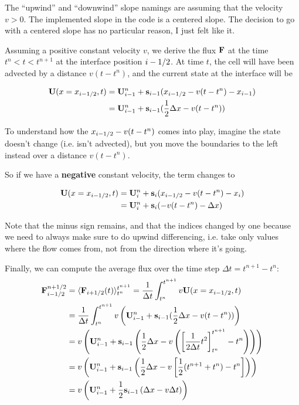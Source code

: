 The ``upwind'' and ``downwind'' slope namings are assuming that the velocity $v > 0$.
The implemented slope in the code is a centered slope.
The decision to go with a centered slope has no particular reason, I just felt like it.



Assuming a positive constant velocity $v$, we derive the flux $\mathbf{F}$ at the time $t^n < t < t^{n+1}$ at the interface position $i-1/2$.
At time $t$, the cell will have been advected by a distance $v (t - t^n)$, and the current state at the interface will be

\begin{align*}
	\mathbf{U}(x=x_{i-1/2}, t) 
		&= \mathbf{U}_{i-1}^n + \mathbf{s}_{i-1} (x_{i-1/2} - v (t - t^n) - x_{i-1}) \\
		&= \mathbf{U}_{i-1}^n + \mathbf{s}_{i-1} (\frac{1}{2} \Delta x - v (t - t^n))
\end{align*}

To understand how the $x_{i-1/2} - v (t - t^n)$ comes into play, imagine the state doesn't change (i.e. isn't advected), but you move the boundaries to the left instead over a distance $v(t - t^n)$.

So if we have a \textbf{negative} constant velocity, the term changes to 

\begin{align*}
	\mathbf{U}(x=x_{i-1/2}, t) 
		&= \mathbf{U}_{i}^n + \mathbf{s}_{i} (x_{i-1/2} - v (t - t^n) - x_{i}) \\
		&= \mathbf{U}_{i}^n + \mathbf{s}_{i} (-v (t - t^n) - \Delta x)
\end{align*}



Note that the minus sign remains, and that the indices changed by one because we need to always make sure to do upwind differencing, i.e. take only values where the flow comes from, not from the direction where it's going.

Finally, we can compute the average flux over the time step $\Delta t = t^{n+1} - t^{n}$:
\begin{align}
	\mathbf{F}_{i-1/2}^{n+1/2} 
	&= \langle \mathbf{F}_{i+1/2}(t)\rangle _{t^n} ^ {t^{n+1}} 
	= \frac{1}{\Delta t} \int_{t^n}^{t^{n+1}} v \mathbf{U}(x 
	= x_{i-1/2}, t) \\
	&= \frac{1}{\Delta t} \int_{t^n}^{t^{n+1}} v \left( \mathbf{U}_{i-1}^n + \mathbf{s}_{i-1} (\frac{1}{2} \Delta x - v (t - t^n)) \right) \\
	&= v \left( \mathbf{U}_{i-1}^n  + \mathbf{s}_{i-1} \left( \frac{1}{2} \Delta x - v \left( \left[ \frac{1}{2 \Delta t} t^2 \right]_{t^n}^{t^{n+1}} - t^n \right)  \right) \right) \\
	&= v \left( \mathbf{U}_{i-1}^n  + \mathbf{s}_{i-1} \left( \frac{1}{2} \Delta x - v \left[ \frac{1}{2} (t^{n+1} + t^n) - t^n \right] \right) \right) \\
	&= v \left( \mathbf{U}_{i-1}^n  + \frac{1}{2} \mathbf{s}_{i-1} \left(\Delta x - v \Delta t \right) \right)
\end{align}



